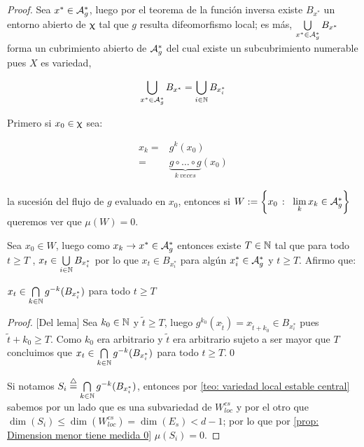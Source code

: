 \begin{proof}
	Sea $x^* \in \mathcal{A}_{g}^{*}$, luego por el teorema de la funci\'on inversa existe $B_{x^*}$ un entorno abierto de $\upchi$ tal que $g$ resulta difeomorfismo local; es m\'as, $\bigcup\limits_{x^* \in \mathcal{A}_{g}^{*}}{B_{x^{*}}}$ forma un cubrimiento abierto de $\mathcal{A}_{g}^{*}$ del cual existe un subcubrimiento numerable pues $X$ es variedad, \ie
	
	\[
	\bigcup\limits_{x^* \in \mathcal{A}_{g}^{*}}{B_{x^{*}}} = \bigcup\limits_{i \in {\mathbb{N}}}{B_{x^{*}_{i}}}
	\]
	
	Primero si $x_0 \in \upchi$ sea:
	
	\begin{equation*}
	\begin{aligned}
	x_k = & g^k(x_0) \\
	= & \underbrace{g \circ \dots \circ g }_{k \ veces} (x_0)
	\end{aligned}
	\end{equation*}
	
	la sucesi\'on del flujo de $g$ evaluado en $x_0$, entonces si $W := \sett{x_0 \ \colon \ \Biglim{k}{x_k \in \mathcal{A}_g^{*}}}$ queremos ver que $\mu(W) = 0$.
	
	Sea $x_0 \in W$, luego como $x_k \rightarrow x^* \in \mathcal{A}_{g}^{*}$ entonces existe $T \in {\mathbb{N}}$ tal que para todo $t \ge T$ , $x_t \in  \bigcup\limits_{i \in {\mathbb{N}}}{B_{x^{*}_{i}}}$ por lo que $x_t \in B_{x^{*}_{i}}$ para alg\'un $x_{i}^{*} \in \mathcal{A}_{g}^{*}$ y $t \ge T$. Afirmo que:
	
	\begin{lemma}
		\label{lemma: teo_principal}
		$x_t \in \bigcap\limits_{k \in {\mathbb{N}}}{g^{-k}(B_{x_{i}^{*}})}$ para todo $t \ge T$
	\end{lemma}

	\begin{proof}{[Del lema]}
		Sea $k_0 \in {\mathbb{N}}$ y $\widetilde{t} \geq T$, luego $g^{k_0}\left(x_{\widetilde{t}}\right) = x_{\widetilde{t} + k_0} \in B_{x_{i}^{*}}$ pues $\widetilde{t} + k_0 \geq T$. Como $k_0$ era arbitrario y $\widetilde{t}$ era arbitrario sujeto a ser mayor que $T$ concluimos que $x_t \in \bigcap\limits_{k \in {\mathbb{N}}}{g^{-k}(B_{x_{i}^{*}})}$ para todo $t \ge T$.\qed
	\end{proof}
	
	Si notamos $S_i \stackrel{\triangle}{=} \bigcap\limits_{k \in {\mathbb{N}}}{g^{-k}(B_{x_{i}^{*}})}$, entonces por \ref{teo: variedad local estable central} sabemos por un lado que es una subvariedad de $W_{loc}^{cs}$ y por el otro que $\dim(S_i) \le \dim(W_{loc}^{cs}) = \dim(E_s) < d-1$; por lo que por \ref{prop: Dimension menor tiene medida 0} $\mu(S_i) = 0$.
	

\end{proof}
